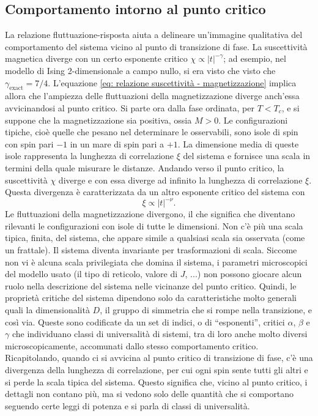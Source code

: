 \subsection{Comportamento intorno al punto critico}
La relazione fluttuazione-risposta aiuta a delineare un'immagine qualitativa del comportamento del sistema vicino al punto di transizione di fase. La suscettività magnetica diverge con un certo esponente critico $\chi \propto |t|^{-\gamma}$; ad esempio, nel modello di Ising 2-dimensionale a campo nullo, si era visto che visto che $\gamma_{\mathrm{exact}} = 7/4$. L'equazione \eqref{eq: relazione suscettività - magnetizzazione} implica allora che l'ampiezza delle fluttuazioni della magnetizzazione diverge anch'essa avvicinandosi al punto critico. Si parte ora dalla fase ordinata, per $T < T_c$, e si suppone che la magnetizzazione sia positiva, ossia $M > 0$. Le configurazioni tipiche, cioè quelle che pesano nel determinare le osservabili, sono isole di spin con spin pari $-1$ in un mare di spin pari a $+1$. La dimensione media di queste isole rappresenta la lunghezza di correlazione $\xi$ del sistema e fornisce una scala in termini della quale misurare le distanze. Andando verso il punto critico, la suscettività $\chi$ diverge e con essa diverge ad infinito la lunghezza di correlazione $\xi$. Questa divergenza è caratterizzata da un altro esponente critico del sistema con
\begin{equation}
    \xi \propto |t|^{-\nu}.
\end{equation}
Le fluttuazioni della magnetizzazione divergono, il che significa che diventano rilevanti le configurazioni con isole di tutte le dimensioni. Non c'è più una scala tipica, finita, del sistema, che appare simile a qualsiasi scala sia osservata (come un frattale). Il sistema diventa invariante per trasformazioni di scala. Siccome non vi è alcuna scala privilegiata che domina il sistema, i parametri microscopici del modello usato (il tipo di reticolo, valore di $J$, ...) non possono giocare alcun ruolo nella descrizione del sistema nelle vicinanze del punto critico. Quindi, le proprietà critiche del sistema dipendono solo da caratteristiche molto generali quali la dimensionalità $D$, il gruppo di simmetria che si rompe nella transizione, e così via. Queste sono codificate da un set di indici, o di ``esponenti'', critici $\alpha$, $\beta$ e $\gamma$ che individuano classi di universalità di sistemi, tra di loro anche molto diversi microscopicamente, accomunati dallo stesso comportamento critico. Ricapitolando, quando ci si avvicina al punto critico di transizione di fase, c'è una divergenza della lunghezza di correlazione, per cui ogni spin sente tutti gli altri e si perde la scala tipica del sistema. Questo significa che, vicino al punto critico, i dettagli non contano più, ma si vedono solo delle quantità che si comportano seguendo certe leggi di potenza e si parla di classi di universalità.

